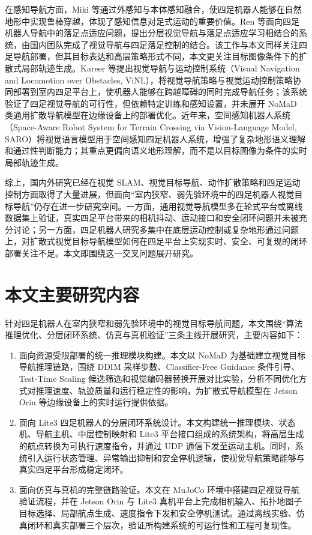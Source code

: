 在感知导航方面，Miki 等\cite{miki2022perceptive}通过外感知与本体感知融合，使四足机器人能够在自然地形中实现鲁棒穿越，体现了感知信息对足式运动的重要价值。Ren 等\cite{ren2023hvn}面向四足机器人导航中的落足点适应问题，提出分层视觉导航与落足点适应学习相结合的系统，由国内团队完成了视觉导航与四足落足控制的结合。该工作与本文同样关注四足导航部署，但其目标表达和高层策略形式不同，本文更关注目标图像条件下的扩散式局部轨迹生成。Kareer 等\cite{kareer2023vinl}提出视觉导航与运动控制系统（Visual Navigation and Locomotion over Obstacles, ViNL），将视觉导航策略与视觉运动控制策略协同部署到室内四足平台上，使机器人能够在跨越障碍的同时完成导航任务；该系统验证了四足视觉导航的可行性，但依赖特定训练和感知设置，并未展开 NoMaD 类通用扩散导航模型在边缘设备上的部署优化。近年来，空间感知机器人系统（Space-Aware Robot System for Terrain Crossing via Vision-Language Model, SARO）\cite{saro2025}将视觉语言模型用于空间感知四足机器人系统，增强了复杂地形语义理解和通过性判断能力；其重点更偏向语义地形理解，而不是以目标图像为条件的实时局部轨迹生成。

综上，国内外研究已经在视觉 SLAM、视觉目标导航、动作扩散策略和四足运动控制方面取得了大量进展，但面向“室内狭窄、弱先验环境中的四足机器人视觉目标导航”仍存在进一步研究空间。一方面，通用视觉导航模型多在轮式平台或离线数据集上验证，真实四足平台带来的相机抖动、运动接口和安全闭环问题并未被充分讨论；另一方面，四足机器人研究多集中在底层运动控制或复杂地形通过问题上，对扩散式视觉目标导航模型如何在四足平台上实现实时、安全、可复现的闭环部署关注不足。本文即围绕这一交叉问题展开研究。

\section{本文主要研究内容}

针对四足机器人在室内狭窄和弱先验环境中的视觉目标导航问题，本文围绕“算法推理优化、分层闭环系统、仿真与真机验证”三条主线开展研究，主要内容如下：

\begin{enumerate}
    \item 面向资源受限部署的统一推理模块构建。本文以 NoMaD 为基础建立视觉目标导航推理链路，围绕 DDIM 采样步数、Classifier-Free Guidance 条件引导、Test-Time Scaling 候选筛选和视觉编码器替换开展对比实验，分析不同优化方式对推理速度、轨迹质量和运行稳定性的影响，为扩散式导航模型在 Jetson Orin 等边缘设备上的实时运行提供依据。
    \item 面向 Lite3 四足机器人的分层闭环系统设计。本文构建统一推理模块、状态机、导航主机、中层控制映射和 Lite3 平台接口组成的系统架构，将高层生成的航点转换为可执行速度指令，并通过 UDP 通信下发至运动主机。同时，系统引入运行状态管理、异常输出抑制和安全停机逻辑，使视觉导航策略能够与真实四足平台形成稳定闭环。
    \item 面向仿真与真机的完整链路验证。本文在 MuJoCo 环境中搭建四足视觉导航验证流程，并在 Jetson Orin 与 Lite3 真机平台上完成相机输入、拓扑地图子目标选择、局部航点生成、速度指令下发和安全停机测试。通过离线实验、仿真闭环和真实部署三个层次，验证所构建系统的可运行性和工程可复现性。
\end{enumerate}

